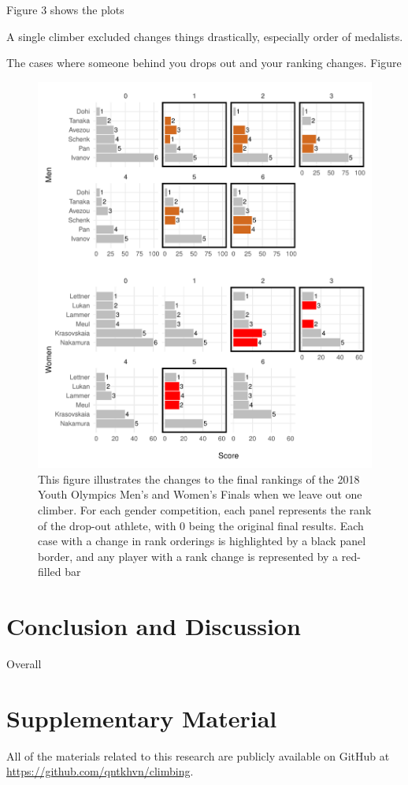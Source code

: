 \documentclass[12pt]{article}
\begin{document}
Figure 3 shows the plots

A single climber excluded changes things drastically, especially order
of medalists.

The cases where someone behind you drops out and your ranking changes.
Figure

\begin{figure}
\centering
\includegraphics{draft_files/figure-latex/unnamed-chunk-12-1.pdf}
\caption{This figure illustrates the changes to the final rankings of
the 2018 Youth Olympics Men's and Women's Finals when we leave out one
climber. For each gender competition, each panel represents the rank of
the drop-out athlete, with 0 being the original final results. Each case
with a change in rank orderings is highlighted by a black panel border,
and any player with a rank change is represented by a red-filled bar}
\end{figure}

\hypertarget{conclusion-and-discussion}{%
\section{Conclusion and Discussion}\label{conclusion-and-discussion}}

Overall

\hypertarget{supplementary-material}{%
\section*{Supplementary Material}\label{supplementary-material}}

All of the materials related to this research are publicly available on
GitHub at \newline \url{https://github.com/qntkhvn/climbing}.



\end{document}
